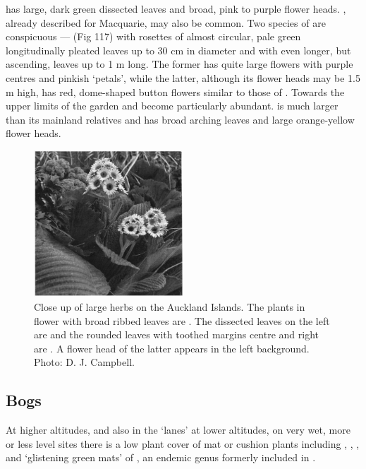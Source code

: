  has large, dark green dissected leaves and broad, pink to purple flower heads. , already described for Macquarie, may also be common.
Two species of  are conspicuous —  (Fig 117) with rosettes of almost circular, pale green longitudinally pleated leaves up to 30 cm in diameter and  with even longer, but ascending, leaves up to 1 m long.
The former has quite large flowers with purple centres and pinkish `petals', while the latter, although its flower heads may be 1.5 m high, has red, dome-shaped button flowers similar to those of .
Towards the upper limits of the garden  and  become particularly abundant.  is much larger than its mainland relatives and has broad arching leaves and large orange-yellow flower heads.

\begin{figure}
	\includegraphics[width=0.5\textwidth]{graphics/figure117herbs.jpg}
	\centering
	\caption[Close up of large herbs on the Auckland Islands]{Close up of large herbs on the Auckland Islands.
    The plants in flower with broad ribbed leaves are .
    The dissected leaves on the left are  and the rounded leaves with toothed margins centre and right are .
    A flower head of the latter appears in the left background.
	Photo: D. J. Campbell.}
	\label{fig:117herbs}
\end{figure}

\subsection{Bogs}

At higher altitudes, and also in the `lanes' at lower altitudes, on very wet, more or less level sites there is a low plant cover of mat or cushion plants including , , ,  and `glistening green mats' of , an endemic genus formerly included in .

